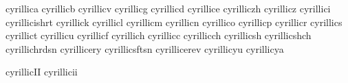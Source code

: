 cyrillica     {}
 cyrillicb     {}
 cyrillicv     {}
 cyrillicg     {}
 cyrillicd     {}
 cyrillice     {}
 cyrilliczh    {}
 cyrillicz     {}
 cyrillici     {}
 cyrillicishrt {}
 cyrillick     {}
 cyrillicl     {}
 cyrillicm     {}
 cyrillicn     {}
 cyrillico     {}
 cyrillicp     {}
 cyrillicr     {}
 cyrillics     {}
 cyrillict     {}
 cyrillicu     {}
 cyrillicf     {}
 cyrillich     {}
 cyrillicc     {}
 cyrillicch    {}
 cyrillicsh    {}
 cyrillicshch  {}
 cyrillichrdsn {}
 cyrillicery   {}
 cyrillicsftsn {}
 cyrillicerev  {}
 cyrillicyu    {}
 cyrillicya    {}





 cyrillicII    {}
 cyrillicii    {}


